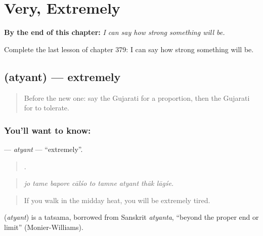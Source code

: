 
\chapter{Very, Extremely}
\label{ch:gu-very-extremely}

\begin{chapteropening}
\textbf{By the end of this chapter:} \emph{I can say how strong something will be.}

Complete the last lesson of chapter 379: I can say how strong something will be.
\end{chapteropening}

\section[\texorpdfstring{\gu{અત્યંત} (atyant)}{અત્યંત (atyant)}]{ (atyant) — extremely}

\label{lesson:GU-C379-atyant}



\begin{quote}
Before the new one: say the Gujarati for a proportion, then the Gujarati for to tolerate.
\end{quote}

\subsection*{You'll want to know: }
\textbf{} — \emph{atyant} — \textquotedblleft{}extremely\textquotedblright{}.

\begin{quote}
        .
\end{quote}

\begin{quote}
\emph{jo tame bapore cālśo to tamne atyant thāk lāgśe.}
\end{quote}

\begin{quote}
If you walk in the midday heat, you will be extremely tired.
\end{quote}

\begin{cousinweb}
\textbf{} (\emph{atyant}) is a tatsama, borrowed from Sanskrit \emph{atyanta}, \textquotedblleft{}beyond the proper end or limit\textquotedblright{} (Monier-Williams).
\end{cousinweb}

